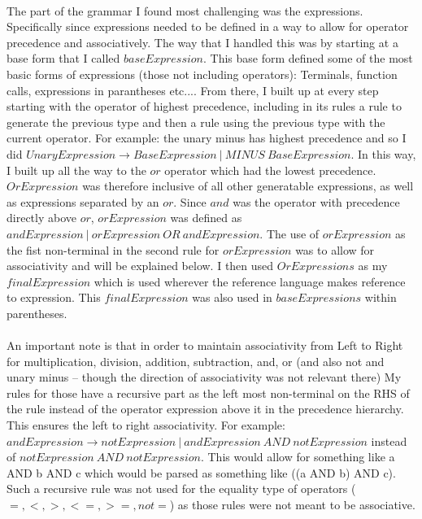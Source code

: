\documentclass[12pt, a3paper]{article}
\begin{document}
\paragraph{}
The part of the grammar I found most challenging was the expressions. Specifically since expressions needed to be defined in a way to allow for operator precedence and associatively.
The way that I handled this was by starting at a base form that I called $baseExpression$. This base form defined some of the  most basic forms of expressions (those not including operators): Terminals, function calls, expressions in parantheses etc.... From there, I built up at every step starting with the operator of highest precedence, including in its rules a rule to generate the previous type and then a rule using the previous type with the current operator. For example: the unary minus has highest precedence and so I did $UnaryExpression \rightarrow BaseExpression \ | \  MINUS\  BaseExpression$. In this way, I built up all the way to the $or$ operator which had the lowest precedence. $OrExpression$ was therefore inclusive of all other generatable expressions, as well as expressions separated by an $or$. Since $and$ was the operator with precedence directly above $or$, $orExpression$ was defined as $andExpression \ | \ orExpression \ OR \ andExpression$. The use of $orExpression$ as the fist non-terminal in the second rule for $orExpression$ was to allow for associativity and will be explained below. I then used $OrExpressions$ as my $finalExpression$ which is used wherever the reference language makes reference to expression. This $finalExpression$ was also used in $baseExpressions$ within parentheses.

\paragraph{}
An important note is that in order to maintain associativity from Left to Right for multiplication, division, addition, subtraction, and, or (and also not and unary minus -- though the direction of associativity was not relevant there) My rules for those have a recursive part as the left most non-terminal on the RHS of the rule instead of the operator expression above it in the precedence hierarchy. This ensures the left to right associativity. For example: $andExpression \rightarrow notExpression \ |  \ andExpression \ AND \ notExpression$ instead of $notExpression \ AND \ notExpression$. This would allow for something like a AND b AND c which would be parsed as something like ((a AND b) AND c). Such a recursive rule was not used for the equality type of operators ($=, <, >, <=, >=, not=$) as those rules were not meant to be associative.
\end{document}
